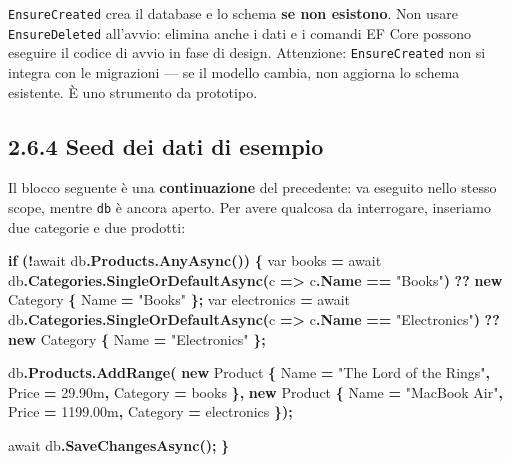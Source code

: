 \documentclass[
  italian,
  10pt,
]{book}
\newenvironment{Shaded}{\begin{snugshade}}{\end{snugshade}}
\newcommand{\DataTypeTok}[1]{\textcolor[rgb]{0.13,0.29,0.53}{#1}}
\newcommand{\FloatTok}[1]{\textcolor[rgb]{0.00,0.00,0.81}{#1}}
\newcommand{\FunctionTok}[1]{\textcolor[rgb]{0.13,0.29,0.53}{\textbf{#1}}}
\newcommand{\KeywordTok}[1]{\textcolor[rgb]{0.13,0.29,0.53}{\textbf{#1}}}
\newcommand{\NormalTok}[1]{#1}
\newcommand{\OperatorTok}[1]{\textcolor[rgb]{0.81,0.36,0.00}{\textbf{#1}}}
\newcommand{\StringTok}[1]{\textcolor[rgb]{0.31,0.60,0.02}{#1}}
\begin{document}
\texttt{EnsureCreated} crea il database e lo schema \textbf{se non
esistono}. Non usare \texttt{EnsureDeleted} all'avvio: elimina anche i
dati e i comandi EF Core possono eseguire il codice di avvio in fase di
design. Attenzione: \texttt{EnsureCreated} non si integra con le
migrazioni --- se il modello cambia, non aggiorna lo schema esistente. È
uno strumento da prototipo.

\subsection{2.6.4 Seed dei dati di
esempio}\label{seed-dei-dati-di-esempio}

Il blocco seguente è una \textbf{continuazione} del precedente: va
eseguito nello stesso scope, mentre \texttt{db} è ancora aperto. Per
avere qualcosa da interrogare, inseriamo due categorie e due prodotti:

\begin{Shaded}
\begin{Highlighting}[]
\KeywordTok{if} \OperatorTok{(!}\NormalTok{await db}\OperatorTok{.}\FunctionTok{Products}\OperatorTok{.}\FunctionTok{AnyAsync}\OperatorTok{())}
\OperatorTok{\{}
    \DataTypeTok{var}\NormalTok{ books }\OperatorTok{=}\NormalTok{ await db}\OperatorTok{.}\FunctionTok{Categories}\OperatorTok{.}\FunctionTok{SingleOrDefaultAsync}\OperatorTok{(}\NormalTok{c }\OperatorTok{=\textgreater{}}\NormalTok{ c}\OperatorTok{.}\FunctionTok{Name} \OperatorTok{==} \StringTok{"Books"}\OperatorTok{)}
        \OperatorTok{??} \KeywordTok{new}\NormalTok{ Category }\OperatorTok{\{}\NormalTok{ Name }\OperatorTok{=} \StringTok{"Books"} \OperatorTok{\};}
    \DataTypeTok{var}\NormalTok{ electronics }\OperatorTok{=}\NormalTok{ await db}\OperatorTok{.}\FunctionTok{Categories}\OperatorTok{.}\FunctionTok{SingleOrDefaultAsync}\OperatorTok{(}\NormalTok{c }\OperatorTok{=\textgreater{}}\NormalTok{ c}\OperatorTok{.}\FunctionTok{Name} \OperatorTok{==} \StringTok{"Electronics"}\OperatorTok{)}
        \OperatorTok{??} \KeywordTok{new}\NormalTok{ Category }\OperatorTok{\{}\NormalTok{ Name }\OperatorTok{=} \StringTok{"Electronics"} \OperatorTok{\};}

\NormalTok{    db}\OperatorTok{.}\FunctionTok{Products}\OperatorTok{.}\FunctionTok{AddRange}\OperatorTok{(}
        \KeywordTok{new}\NormalTok{ Product }\OperatorTok{\{}\NormalTok{ Name }\OperatorTok{=} \StringTok{"The Lord of the Rings"}\OperatorTok{,}\NormalTok{ Price }\OperatorTok{=} \FloatTok{29.90m}\OperatorTok{,}\NormalTok{ Category }\OperatorTok{=}\NormalTok{ books }\OperatorTok{\},}
        \KeywordTok{new}\NormalTok{ Product }\OperatorTok{\{}\NormalTok{ Name }\OperatorTok{=} \StringTok{"MacBook Air"}\OperatorTok{,}\NormalTok{ Price }\OperatorTok{=} \FloatTok{1199.00m}\OperatorTok{,}\NormalTok{ Category }\OperatorTok{=}\NormalTok{ electronics }\OperatorTok{\});}

\NormalTok{    await db}\OperatorTok{.}\FunctionTok{SaveChangesAsync}\OperatorTok{();}
\OperatorTok{\}}
\end{Highlighting}
\end{Shaded}
\end{document}
